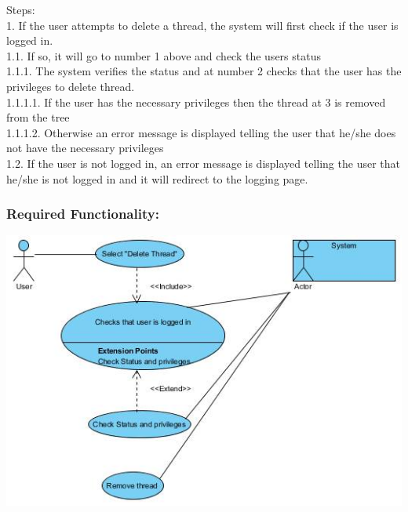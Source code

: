 \documentclass[a4paper,11pt]{article}
\begin{document}
Steps:\\
1.	If the user attempts to delete a thread, the system will first check if the user is logged in.\\
1.1.	If so, it will go to number 1 above and check the users status\\
1.1.1.	The system verifies the status and at number 2 checks that the user has the privileges to delete thread.\\
1.1.1.1.	If the user has the necessary privileges then the thread at 3 is removed from the tree\\
1.1.1.2.	Otherwise an error message is displayed telling the user that he/she does not have the necessary privileges \\
1.2.	If the user is not logged in, an error message is displayed telling the user that he/she is not logged in and it will redirect to the logging page.\\
\subsubsection{Required Functionality:} 
\includegraphics[width=1\linewidth]{./Images/CRUDThread/Diagrams/14.jpg}\\
\end{document}
